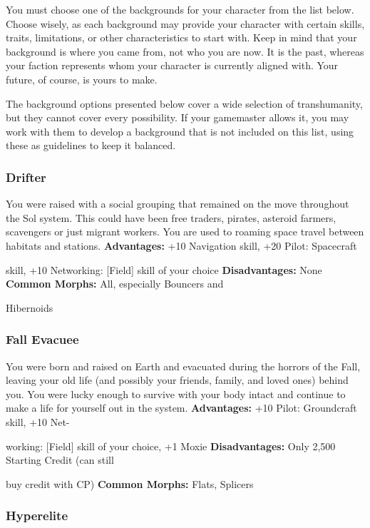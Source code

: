 You must choose one of the backgrounds for your 
character from the list below. Choose wisely, as each 
background may provide your character with certain 
skills, traits, limitations, or other characteristics to 
start with. Keep in mind that your background is 
where you came from, not who you are now. It is 
the past, whereas your faction represents whom your 
character is currently aligned with. Your future, of 
course, is yours to make.

The background options presented below cover a 
wide selection of transhumanity, but they cannot cover 
every possibility. If your gamemaster allows it, you 
may work with them to develop a background that is 
not included on this list, using these as guidelines to 
keep it balanced.

\subsubsection{Drifter}

You were raised with a social grouping that remained 
on the move throughout the Sol system. This could 
have been free traders, pirates, asteroid farmers, scavengers
or just migrant workers. You are used to roaming
space travel between habitats and stations.
\textbf{Advantages:} +10 Navigation skill, +20 Pilot: Spacecraft 

skill, +10 Networking: [Field] skill of your choice
\textbf{Disadvantages:} None
\textbf{Common Morphs:} All, especially Bouncers and 

Hibernoids

\subsubsection{Fall Evacuee}

You were born and raised on Earth and evacuated 
during the horrors of the Fall, leaving your old life 
(and possibly your friends, family, and loved ones) 
behind you. You were lucky enough to survive with 
your body intact and continue to make a life for yourself
out in the system.
\textbf{Advantages:  }+10 Pilot: Groundcraft skill, +10 Net-

working: [Field] skill of your choice, +1 Moxie
\textbf{Disadvantages:} Only 2,500 Starting Credit (can still 

buy credit with CP)
\textbf{Common Morphs:} Flats, Splicers

\subsubsection{Hyperelite}

